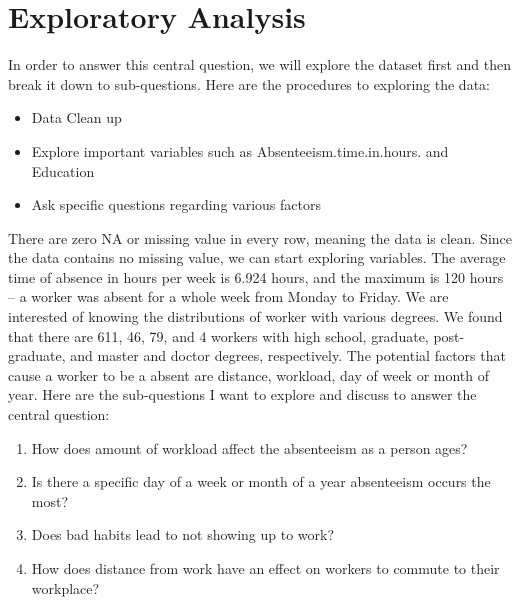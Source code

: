 \documentclass{article}
\begin{document}
\section{Exploratory Analysis}
In order to answer this central question, we will explore the dataset first and then break it down to sub-questions. Here are the procedures to exploring the data:
\begin{itemize}
  \item Data Clean up
  \item Explore important variables such as Absenteeism.time.in.hours. and Education
  \item Ask specific questions regarding various factors
\end{itemize}

There are zero NA or missing value in every row, meaning the data is clean. Since the data contains no missing value, we can start exploring variables. The average time of absence in hours per week is 6.924 hours, and the maximum is 120 hours -- a worker was absent for a whole week from Monday to Friday. We are interested of knowing the distributions of worker with various degrees. We found that there are 611, 46, 79, and 4 workers with high school, graduate, post-graduate, and master and doctor degrees, respectively. The potential factors that cause a worker to be a absent are distance, workload, day of week or month of year. Here are the sub-questions I want to explore and discuss to answer the central question: 
\begin{enumerate}
    \item How does amount of workload affect the absenteeism as a person ages?
    \item Is there a specific day of a week or month of a year absenteeism occurs the most?
    \item Does bad habits lead to not showing up to work?
    \item How does distance from work have an effect on workers to commute to their workplace?
\end{enumerate}
\end{document}
